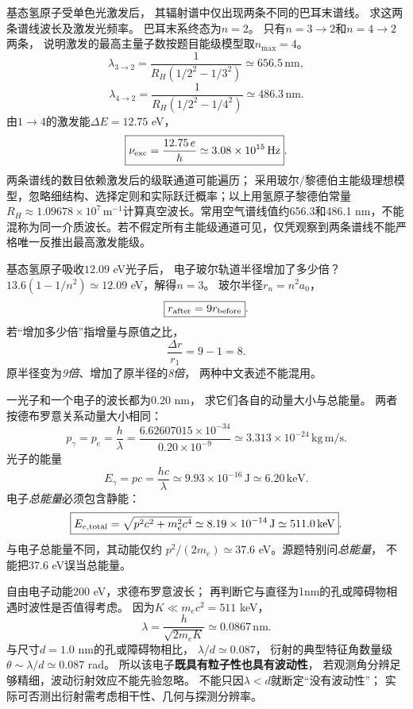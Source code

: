 \problemtext 基态氢原子受单色光激发后，
其辐射谱中仅出现两条不同的巴耳末谱线。
求这两条谱线波长及激发光频率。
\workings
巴耳末系终态为$n=2$。
只有$n=3\to2$和$n=4\to2$两条，
说明激发的最高主量子数按题目能级模型取$n_{\max}=4$。
\[
\boxed{\lambda_{3\to2}
=\frac1{R_H(1/2^2-1/3^2)}
\simeq656.5\,\mathrm{nm}},
\]
\[
\boxed{\lambda_{4\to2}
=\frac1{R_H(1/2^2-1/4^2)}
\simeq486.3\,\mathrm{nm}}.
\]
由$1\to4$的激发能$\Delta E=12.75$ eV，
\[
\boxed{\nu_{\rm exc}=\frac{12.75\,e}{h}
\simeq3.08\times10^{15}\,\mathrm{Hz}}.
\]
\crosscheck 两条谱线的数目依赖激发后的级联通道可能遍历；
采用玻尔/黎德伯主能级理想模型，忽略细结构、选择定则和实际跃迁概率；以上用氢原子黎德伯常量$R_H\approx1.09678\times10^7\,\mathrm{m^{-1}}$计算真空波长。常用空气谱线值约656.3和486.1 nm，不能混称为同一介质波长。若不假定所有主能级通道可见，仅凭观察到两条谱线不能严格唯一反推出最高激发能级。

\problemtext 基态氢原子吸收$12.09$ eV光子后，
电子玻尔轨道半径增加了多少倍？
\workings
$13.6(1-1/n^2)\simeq12.09$ eV，解得$n=3$。
玻尔半径$r_n=n^2a_0$，
\[
\boxed{r_{\rm after}=9r_{\rm before}}.
\]
若“增加多少倍”指增量与原值之比，
\[
\boxed{\frac{\Delta r}{r_1}=9-1=8}.
\]
\crosscheck 原半径变为\emph{9倍}、增加了原半径的\emph{8倍}，
两种中文表述不能混用。

\problemtext 一光子和一个电子的波长都为$0.20$ nm，
求它们各自的动量大小与总能量。
\workings
两者按德布罗意关系动量大小相同：
\[
\boxed{p_\gamma=p_e=\frac{h}{\lambda}
=\frac{6.62607015\times10^{-34}}{0.20\times10^{-9}}
\simeq3.313\times10^{-24}\,\mathrm{kg\,m/s}}.
\]
光子的能量
\[
\boxed{E_\gamma=pc=\frac{hc}{\lambda}
\simeq9.93\times10^{-16}\,\mathrm J
\simeq6.20\,\mathrm{keV}}.
\]
电子\emph{总能量}必须包含静能：
\[
\boxed{E_{e,\rm total}=\sqrt{p^2c^2+m_e^2c^4}
\simeq8.19\times10^{-14}\,\mathrm J
\simeq511.0\,\mathrm{keV}}.
\]
\crosscheck 与电子总能量不同，其动能仅约
$p^2/(2m_e)\simeq37.6$ eV。源题特别问\emph{总能量}，
不能把37.6 eV误当总能量。

\problemtext 自由电子动能$200$ eV，求德布罗意波长；
再判断它与直径为1nm的孔或障碍物相遇时波性是否值得考虑。
\workings
因为$K\ll m_ec^2=511$ keV，
\[
\boxed{\lambda=\frac{h}{\sqrt{2m_eK}}
\simeq0.0867\,\mathrm{nm}}.
\]
与尺寸$d=1.0$ nm的孔或障碍物相比，
$\lambda/d\simeq0.087$，
衍射的典型特征角数量级
$\theta\sim\lambda/d\simeq0.087$ rad。
所以该电子\textbf{既具有粒子性也具有波动性}，
若观测角分辨足够精细，波动衍射效应不能先验忽略。
\crosscheck 不能只因$\lambda<d$就断定“没有波动性”；
实际可否测出衍射需考虑相干性、几何与探测分辨率。

